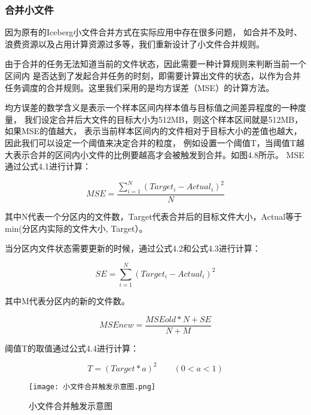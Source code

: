 \subsubsection{合并小文件}

因为原有的Iceberg小文件合并方式在实际应用中存在很多问题，
如合并不及时、浪费资源以及占用计算资源过多等，我们重新设计了小文件合并规则。

由于合并的任务无法知道当前的文件状态，因此需要一种计算规则来判断当前一个区间内
是否达到了发起合并任务的时刻，即需要计算出文件的状态，以作为合并任务调度的合并规则。这里我们采用的是均方误差（MSE）的计算方法。

均方误差的数学含义是表示一个样本区间内样本值与目标值之间差异程度的一种度量，
我们设定合并后大文件的目标大小为512MB，则这个样本区间就是512MB，如果MSE的值越大，
表示当前样本区间内的文件相对于目标大小的差值也越大，因此我们可以设定一个阈值来决定合并的粒度，
例如设置一个阈值T，当阈值T越大表示合并的区间内小文件的比例要越高才会被触发到合并。如图4.8所示。
MSE通过公式4.1进行计算：

\begin{equation}
  MSE=\frac {\sum_{i=1}^{N}{(Target_i - Actual_i)^2}} {N}
  \label{eq:example}
\end{equation}

其中N代表一个分区内的文件数，Target代表合并后的目标文件大小，Actual等于min(分区内实际的文件大小, Target）。

当分区内文件状态需要更新的时候，通过公式4.2和公式4.3进行计算：

\begin{equation}
  SE=\sum_{i=1}^{N}{(Target_i - Actual_i)^2}
  \label{eq:example}
\end{equation}

其中M代表分区内的新的文件数。

\begin{equation}
  MSEnew=\frac {MSEold*N+SE} {N+M}
  \label{eq:example}
\end{equation}

阈值T的取值通过公式4.4进行计算：

\begin{equation}
  T=(Target*a)^2 \qquad (0<a<1)
  \label{eq:example}
\end{equation}

\begin{figure}[h]
  \centering
  \texttt{[image: 小文件合并触发示意图.png]}
  \caption{小文件合并触发示意图}
  \label{fig:badge}
\end{figure}

